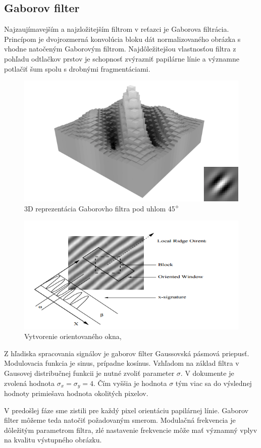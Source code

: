 \documentclass[11pt,a4paper]{article}
\begin{document}
\subsection*{Gaborov filter}
Najzaujímavejším a najzložitejším filtrom v reťazci je Gaborova filtrácia. Princípom je dvojrozmerná konvolúcia bloku dát normalizovaného obrázka s vhodne natočeným Gaborovým filtrom. Najdôležitejšou vlastnosťou filtra z pohľadu odtlačkov prstov je schopnosť zvýrazniť papilárne línie a významne potlačiť šum spolu s drobnými fragmentáciami. 

\begin{figure}[h!]
	\centering
	\includegraphics[width=.4\linewidth]{images/gabor_kernel}
	\caption{3D reprezentácia Gaborovho filtra pod uhlom 45$\degree$}
	\label{fig:7}
\end{figure}

\begin{figure}[h!]
	\centering
	\includegraphics[width=.7\linewidth]{images/Screenshot_11}
	\caption{Vytvorenie orientovaného okna, \cite{hong}}
	\label{fig:6}
\end{figure}

Z hľadiska spracovania signálov je gaborov filter Gaussovská pásmová priepusť. Modulovacia funkcia je sinus, prípadne kosínus. Vzhľadom na základ filtra v Gausovej distribučnej funkcii je nutné zvoliť parameter $\sigma$. V dokumente \cite{hong} je zvolená hodnota $\sigma_x = \sigma_y = 4$. Čím vyššia je hodnota $\sigma$ tým viac sa do výslednej hodnoty primiešava hodnota okolitých pixelov.


V predošlej fáze sme zistili pre každý pixel orientáciu papilárnej línie. Gaborov filter môžeme teda natočiť požadovaným smerom. Modulačná frekvencia je dôležitým parametrom filtra, zlé nastavenie frekvencie môže mať významný vplyv na kvalitu výstupného obrázku. 
\end{document}
